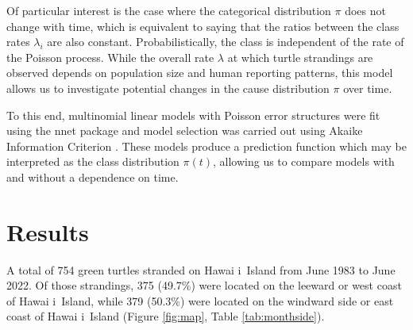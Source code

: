 \documentclass[sn-basic,NameDate]{sn-jnl}\usepackage[]{graphicx}\usepackage[]{xcolor}
\DeclareRobustCommand{\okina}{%
  \raisebox{\dimexpr\fontcharht\font`A-\height}{%
    \scalebox{0.8}{`}%
  }%
}
\newcommand{\Hawaii}{Hawai\okina i}
\begin{document}
Of particular interest is the case where the categorical distribution $\pi$ does not change with time, which is equivalent to saying that the ratios between the class rates $\lambda_i$ are also constant. 
Probabilistically, the class is independent of the rate of the Poisson process. 
While the overall rate $\lambda$ at which turtle strandings are observed depends on population size and human reporting patterns, this model allows us to investigate potential changes in the cause distribution $\pi$ over time.

To this end, multinomial linear models with Poisson error structures were fit using the nnet package \citep{nnet} and model selection was carried out using Akaike Information Criterion \citep{akaike1974new}. 
These models produce a prediction function which may be interpreted as the class distribution $\pi(t)$, allowing us to compare models with and without a dependence on time.

\section{Results}


A total of 754 green turtles stranded on \Hawaii\ Island from June 1983 to June 2022. 
Of those strandings, 
375 (49.7\%) 
were located on the leeward or west coast of \Hawaii\ Island, while 
379 (50.3\%) 
were located on the windward side or east coast of \Hawaii\ Island (Figure \ref{fig:map}, Table \ref{tab:monthside}). 
\end{document}
